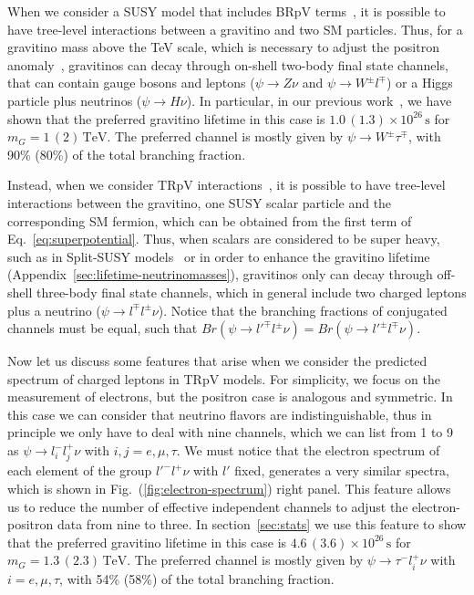 \documentclass[a4paper,11pt]{article}
\begin{document}
When we consider a SUSY model that includes BRpV terms~\cite{Grefe:2011dp}, it is possible to have tree-level interactions between a gravitino and two SM particles. Thus, for a gravitino mass above the TeV scale, which is necessary to adjust the positron anomaly~\cite{Aguilar:2014mma}, gravitinos can decay through on-shell two-body final state channels, that can contain gauge bosons and leptons ($\psi\rightarrow Z \nu$ and $\psi\rightarrow W^{\pm} l^{\mp}$) or a Higgs particle plus neutrinos ($\psi\rightarrow H\nu$). In particular, in our previous work~\cite{Carquin:2015uma}, we have shown that the preferred gravitino lifetime in this case is $1.0\,(1.3)\times10^{26}\,\text{s}$ for $m_G = 1\,(2) \,\text{TeV}$. The preferred channel is mostly given by $\psi\rightarrow W^{\pm} \tau^{\mp}$, with 90\% (80\%) of the total branching fraction.

Instead, when we consider TRpV interactions~\cite{Grefe:2011dp}, it is possible to have tree-level interactions between the  gravitino, one SUSY scalar particle and the corresponding SM fermion, which can be obtained from the first term of Eq.~\ref{eq:superpotential}. Thus, when scalars are considered to be super heavy, such as in Split-SUSY models~\cite{Giudice_2005} or in order to enhance the gravitino lifetime (Appendix~\ref{sec:lifetime-neutrinomasses}), gravitinos only can decay through off-shell three-body final state channels, which in general include two charged leptons plus a neutrino ($\psi\rightarrow l^{\mp} l^{\pm} \nu$). Notice that the branching fractions of conjugated channels must be equal, such that $Br(\psi \rightarrow l'^{\mp}l^{\pm} \nu) = Br(\psi \rightarrow l'^{\pm}l^{\mp} \nu)$. 

Now let us discuss some features that arise when we consider the predicted spectrum of charged leptons in TRpV models. For simplicity, we focus on the measurement of electrons, but the positron case is analogous and symmetric. In this case we can consider that neutrino flavors are indistinguishable, thus in principle we only have to deal with nine channels, which we can list from 1 to 9 as $\psi\rightarrow l_i^{-}l_j^{+}\nu$ with $i,j=e,\mu,\tau$. We must notice that the electron spectrum of each element of the group $l'^{-}l^{+}\nu$ with $l'$ fixed, generates a very similar spectra, which is shown in Fig.~(\ref{fig:electron-spectrum}) right panel. This feature allows us to reduce the number of effective independent channels to adjust the electron-positron data from nine to three. In section~\ref{sec:stats} we use this feature to show that the preferred gravitino lifetime in this case is $4.6\,(3.6)\times10^{26}\,\text{s}$ for $m_G = 1.3\,(2.3) \,\text{TeV}$. The preferred channel is mostly given by $\psi\rightarrow \tau^{-} l_i^{+}\nu$ with $i=e,\mu,\tau$, with 54\% (58\%) of the total branching fraction.
\end{document}
